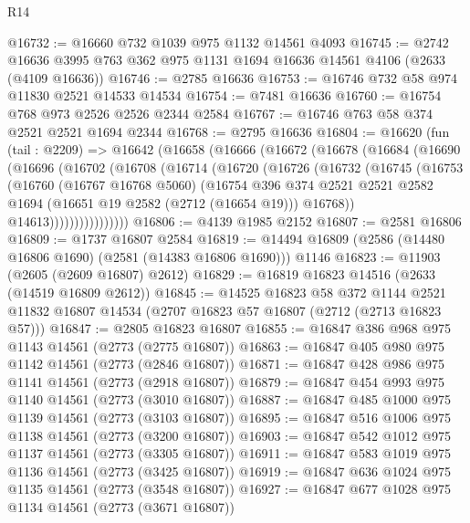 \begin{lexlean}{R14}
\begin{coremodule}
@16732 := @16660 @732 @1039 @975 @1132 @14561 @4093
@16745 := @2742 @16636 @3995 @763 @362 @975 @1131 @1694 @16636 @14561 @4106 (@2633 (@4109 @16636))
@16746 := @2785 @16636
@16753 := @16746 @732 @58 @974 @11830 @2521 @14533 @14534
@16754 := @7481 @16636
@16760 := @16754 @768 @973 @2526 @2526 @2344 @2584
@16767 := @16746 @763 @58 @374 @2521 @2521 @1694 @2344
@16768 := @2795 @16636
@16804 := @16620
    (fun (tail : @2209) =>
    @16642
      (@16658
        (@16666
          (@16672
            (@16678
              (@16684
                (@16690
                  (@16696
                    (@16702
                      (@16708
                        (@16714
                          (@16720
                            (@16726
                              (@16732
                                (@16745
                                  (@16753
                                    (@16760
                                      (@16767 @16768 @5060)
                                      (@16754
                                        @396
                                        @374
                                        @2521
                                        @2521
                                        @2582
                                        @1694
                                        (@16651 @19 @2582 (@2712 (@16654 @19)))
                                        @16768))
                                    @14613))))))))))))))))
@16806 := @4139 @1985 @2152
@16807 := @2581 @16806
@16809 := @1737 @16807 @2584
@16819 := @14494 @16809 (@2586 (@14480 @16806 @1690) (@2581 (@14383 @16806 @1690))) @1146
@16823 := @11903 (@2605 (@2609 @16807) @2612)
@16829 := @16819 @16823 @14516 (@2633 (@14519 @16809 @2612))
@16845 := @14525
    @16823
    @58
    @372
    @1144
    @2521
    @11832
    @16807
    @14534
    (@2707 @16823 @57 @16807 (@2712 (@2713 @16823 @57)))
@16847 := @2805 @16823 @16807
@16855 := @16847 @386 @968 @975 @1143 @14561 (@2773 (@2775 @16807))
@16863 := @16847 @405 @980 @975 @1142 @14561 (@2773 (@2846 @16807))
@16871 := @16847 @428 @986 @975 @1141 @14561 (@2773 (@2918 @16807))
@16879 := @16847 @454 @993 @975 @1140 @14561 (@2773 (@3010 @16807))
@16887 := @16847 @485 @1000 @975 @1139 @14561 (@2773 (@3103 @16807))
@16895 := @16847 @516 @1006 @975 @1138 @14561 (@2773 (@3200 @16807))
@16903 := @16847 @542 @1012 @975 @1137 @14561 (@2773 (@3305 @16807))
@16911 := @16847 @583 @1019 @975 @1136 @14561 (@2773 (@3425 @16807))
@16919 := @16847 @636 @1024 @975 @1135 @14561 (@2773 (@3548 @16807))
@16927 := @16847 @677 @1028 @975 @1134 @14561 (@2773 (@3671 @16807))

\end{coremodule}
\end{lexlean}
